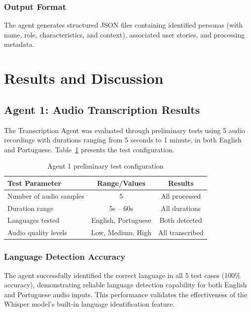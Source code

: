 \documentclass[12pt]{article}
\begin{document}
\subsubsection{Output Format}

The agent generates structured JSON files containing identified personas (with name, role, characteristics, and context), associated user stories, and processing metadata.


\section{Results and Discussion}
\label{sec:results}

\subsection{Agent 1: Audio Transcription Results}
\label{sec:results_agent1}

The Transcription Agent was evaluated through preliminary tests using 5 audio recordings with durations ranging from 5 seconds to 1 minute, in both English and Portuguese. Table~\ref{tab:agent1_tests} presents the test configuration.

\begin{table}[H]
\centering
\caption{Agent 1 preliminary test configuration}
\label{tab:agent1_tests}
\begin{tabular}{lcc}
\toprule
\textbf{Test Parameter} & \textbf{Range/Values} & \textbf{Results} \\
\midrule
Number of audio samples & 5 & All processed \\
Duration range & 5s -- 60s & All durations \\
Languages tested & English, Portuguese & Both detected \\
Audio quality levels & Low, Medium, High & All transcribed \\
\bottomrule
\end{tabular}
\end{table}

\subsubsection{Language Detection Accuracy}

The agent successfully identified the correct language in all 5 test cases (100\% accuracy), demonstrating reliable language detection capability for both English and Portuguese audio inputs. This performance validates the effectiveness of the Whisper model's built-in language identification feature.
\end{document}
